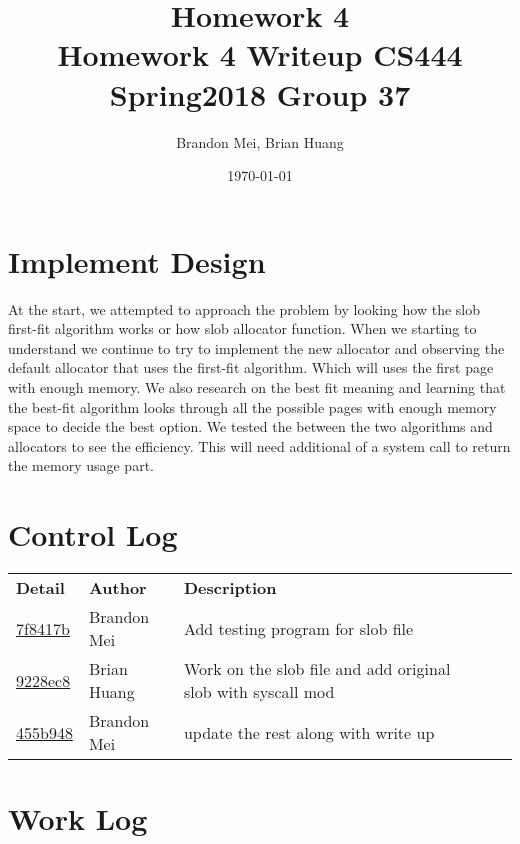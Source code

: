 \documentclass[onecolumn, draftclsnofoot, 10pt, titlepage, compsoc]{IEEEtran}
\title
{%
	Homework 4 \\
	\vspace{0.4cm}
	\large Homework 4 Writeup
	\vspace{0.4cm}
	\large CS444 Spring2018 Group 37
}
\author{Brandon Mei, Brian Huang}
\date{\today}
\begin{document}
\maketitle

\newpage

\section{Implement Design}

At the start, we attempted to approach the problem by looking how the slob first-fit algorithm works or how slob allocator function. When we starting to understand we continue to try to implement the new allocator and observing the default allocator that uses the first-fit algorithm. Which will uses the first page with enough memory. We also research on the best fit meaning and learning that the best-fit algorithm looks through all the possible pages with enough memory space to decide the best option. We tested the between the two algorithms and allocators to see the efficiency. This will need additional of a system call to return the memory usage part. 

\section{Control Log}

\begin{tabular}{l p{5cm} l p{5cm} l}
\textbf{Detail} & \textbf{Author} & \textbf{Description}\\
\href{https://github.com/BrandonMei/Operating-Systems-II/commit/7f8417be8bcac9971c24c53b8cf7e3b8a21fb3bd}{7f8417b} & Brandon Mei & Add testing program for slob file\\\hline
\href{https://github.com/BrandonMei/Operating-Systems-II/commit/9228ec87496add47f3988721fdb898f0cf0fb4b0}{9228ec8} & Brian Huang & Work on the slob file and add original slob with syscall mod\\\hline
\href{https://github.com/BrandonMei/Operating-Systems-II/commit/455b948f6fa4bd664c303a0e7ca383fb4e0bc508}{455b948} & Brandon Mei & update the rest along with write up\\\hline

\end{tabular}

\section{Work Log}
\end{document}
